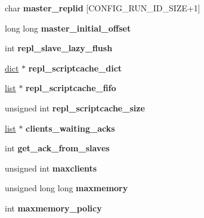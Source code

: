 \begin{DoxyCompactItemize}
\mbox{\label{structredisServer_a445b8a6f8cde5f9030b8432fa86a7ade}} 
char {\bfseries master\+\_\+replid} \mbox{[}C\+O\+N\+F\+I\+G\+\_\+\+R\+U\+N\+\_\+\+I\+D\+\_\+\+S\+I\+ZE+1\mbox{]}
\item 
\mbox{\label{structredisServer_a8e62503033f70d1b1f602b7ad86938b1}} 
long long {\bfseries master\+\_\+initial\+\_\+offset}
\item 
\mbox{\label{structredisServer_a33567ee1e9af4d87033b5da6b355065a}} 
int {\bfseries repl\+\_\+slave\+\_\+lazy\+\_\+flush}
\item 
\mbox{\label{structredisServer_af7799afd20cef346567577a6e0397147}} 
\hyperlink{structdict}{dict} $\ast$ {\bfseries repl\+\_\+scriptcache\+\_\+dict}
\item 
\mbox{\label{structredisServer_a09255fe8de766f27551ffcf0c58a0840}} 
\hyperlink{structlist}{list} $\ast$ {\bfseries repl\+\_\+scriptcache\+\_\+fifo}
\item 
\mbox{\label{structredisServer_aca00ac6e60fb4fe0656391306daa1c02}} 
unsigned int {\bfseries repl\+\_\+scriptcache\+\_\+size}
\item 
\mbox{\label{structredisServer_ac137194f40b41b46b0db9c3411d4a524}} 
\hyperlink{structlist}{list} $\ast$ {\bfseries clients\+\_\+waiting\+\_\+acks}
\item 
\mbox{\label{structredisServer_a7f2801c1f326dfcb2581ba6efad86b76}} 
int {\bfseries get\+\_\+ack\+\_\+from\+\_\+slaves}
\item 
\mbox{\label{structredisServer_ad61570a534b33fddc40435d087b15628}} 
unsigned int {\bfseries maxclients}
\item 
\mbox{\label{structredisServer_a4b8bb708b39d5495b6b465d041229186}} 
unsigned long long {\bfseries maxmemory}
\item 
\mbox{\label{structredisServer_ac165e497fd2d6b3881f4cbab86889d58}} 
int {\bfseries maxmemory\+\_\+policy}

\end{DoxyCompactItemize}
